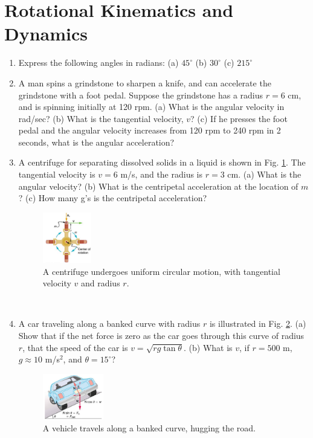 \documentclass[10pt]{article}
\begin{document}
\section{Rotational Kinematics and Dynamics}
\begin{enumerate}
\item Express the following angles in radians: (a) $45^{\circ}$ (b) $30^{\circ}$ (c) $215^{\circ}$ \\ \vspace{1.75cm}
\item A man spins a grindstone to sharpen a knife, and can accelerate the grindstone with a foot pedal.  Suppose the grindstone has a radius $r=6$ cm, and is spinning initially at 120 rpm.  (a) What is the angular velocity in rad/sec? (b) What is the tangential velocity, $v$? (c) If he presses the foot pedal and the angular velocity increases from 120 rpm to 240 rpm in 2 seconds, what is the angular acceleration? \\ \vspace{2cm}
\item A centrifuge for separating dissolved solids in a liquid is shown in Fig. \ref{fig:cent}.  The tangential velocity is $v=6$ m/s, and the radius is $r=3$ cm.  (a) What is the angular velocity? (b) What is the centripetal acceleration at the location of $m$? (c) How many g's is the centripetal acceleration?
\begin{figure}[ht]
\centering
\includegraphics[width=0.2\textwidth]{figures/centrifuge.png}
\caption{\label{fig:cent} A centrifuge undergoes uniform circular motion, with tangential velocity $v$ and radius $r$.}
\end{figure} \\ \vspace{2cm}
\item A car traveling along a banked curve with radius $r$ is illustrated in Fig. \ref{fig:car}.  (a) Show that if the net force is zero as the car goes through this curve of radius $r$, that the speed of the car is $v = \sqrt{rg\tan\theta}$. (b) What is $v$, if $r=500$ m, $g\approx 10$ m/s$^2$, and $\theta = 15^{\circ}$?
\begin{figure}[ht]
\centering
\includegraphics[width=0.25\textwidth]{figures/car.png}
\caption{\label{fig:car} A vehicle travels along a banked curve, hugging the road.}
\end{figure} \\ \vspace{1cm}
\end{enumerate}
\end{document}

